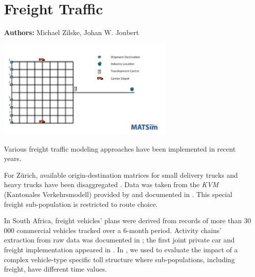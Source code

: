 \chapter{Freight Traffic}
\label{ch:freight}

\hfill \textbf{Authors:} Michael Zilske, Johan W. Joubert

\begin{center} \includegraphics[width=0.65\textwidth, angle=0]{extending/figures/freightcarriers} \end{center}



Various  freight traffic modeling approaches have been implemented in recent years. 

For Zürich, available origin-destination matrices for small delivery trucks and heavy trucks have been disaggregated \citet[][]{ShahM_TechRep_IVT_2010}. Data was taken from the \emph{KVM} (Kantonales Verkehrsmodell) provided by \citet{AMV_Webpage_2011} and documented in \citet[][]{GottardiBuergler_SV_1999}. This special freight sub-population is restricted to route choice.

In South Africa, freight vehicles' plans were derived from  records of more than 30\,000 commercial vehicles tracked over a 6-month period.  Activity chains' extraction from raw  data was documented in \citet[][]{JoubertAxhausen_JTG_2011}; the first joint private car and freight implementation appeared in \citet[][]{JoubertJEtAl_TRR_2010}. In \citet[][]{NagelKickhoeferJoubert2014HeterogeneousVoTsPROCEDIA}, we used  to evaluate the impact of a complex vehicle-type specific toll structure where sub-populations, including freight, have different time values.

